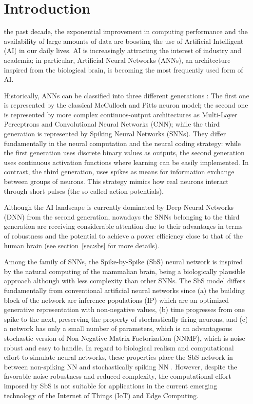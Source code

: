 
\section{Introduction}
\label{sec:introduction}
 the past decade,  the exponential improvement in computing performance and the availability of large amounts of data are boosting the use of Artificial Intelligent (AI) in our daily lives. AI is increasingly attracting the interest of industry and academia; in particular,  Artificial Neural Networks (ANNs), an architecture inspired from the biological brain, is becoming the most frequently used form of AI. 

Historically, ANNs can be classified into three different generations \cite{Design_Exploration_SbS_Trans20}: The first one is represented by the classical McCulloch and Pitts neuron model; the second one is represented by more complex continuos-output architectures as Multi-Layer Perceptrons and Convolutional Neural Networks (CNN); while the third generation is represented by Spiking Neural Networks (SNNs). They differ fundamentally in the neural computation and the neural coding strategy: while the first generation uses discrete binary values as outputs, the second generation uses continuous activation functions where learning can be easily implemented. In contrast, the third generation, uses spikes as means for information exchange between groups of neurons. This strategy mimics how real neurons interact through short pulses (the so called action potentials).

Although the AI landscape is currently dominated by Deep Neural Networks (DNN) from the second generation, nowadays the SNNs belonging to the third generation are receiving considerable attention \cite{Spinnaker_Trans13,ernst2007efficient,Design_Exploration_SbS_Trans20, SNN_Survey_Trans19} due to their advantages in terms of robustness and the
potential to achieve a power efficiency close to that of the human
brain (see section~\ref{sec:sbs} for more details). 

Among the family of SNNs, the Spike-by-Spike (SbS) neural network \cite{ernst2007efficient} is inspired by the natural computing of the mammalian brain, being a biologically plausible approach although with less complexity than other SNNs. The SbS model differs fundamentally from conventional artificial neural networks since (a) the building block of the network are inference populations (IP) which are an optimized generative representation with non-negative values, (b) time progresses from one spike to the next, preserving the property of stochastically firing neurons, and (c) a network has only a small number of parameters, which is an advantageous stochastic version of Non-Negative Matrix Factorization (NNMF), which is noise-robust and easy to handle. In regard to biological realism and computational effort to simulate neural networks, these properties place the SbS network in between non-spiking NN and stochastically spiking NN \cite{rotermund2019Backpropagation}. However, despite the favorable noise robustness and reduced complexity, the computational effort imposed by SbS is not suitable for applications in the current emerging technology of the Internet of Things (IoT) and Edge Computing.

